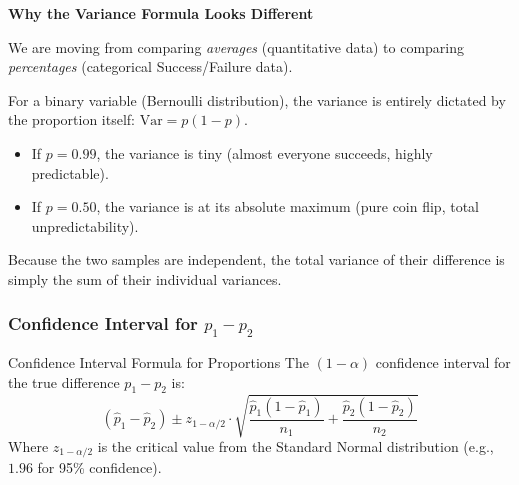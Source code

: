\vspace{0.2cm}
\begin{example}{\textbf{Why the Variance Formula Looks Different}}

We are moving from comparing \textit{averages} (quantitative data) to comparing \textit{percentages} (categorical Success/Failure data).

For a binary variable (Bernoulli distribution), the variance is entirely dictated by the proportion itself: $\text{Var} = p(1-p)$. 
\begin{itemize}
    \item If $p = 0.99$, the variance is tiny (almost everyone succeeds, highly predictable).
    \item If $p = 0.50$, the variance is at its absolute maximum (pure coin flip, total unpredictability).
\end{itemize}
Because the two samples are independent, the total variance of their difference is simply the sum of their individual variances.
\end{example}

\subsubsection{Confidence Interval for $p_1 - p_2$}

\begin{defbox}{Confidence Interval Formula for Proportions}
The $(1-\alpha)$ confidence interval for the true difference $p_1 - p_2$ is:
\begin{equation}
    (\hat{p}_{1}-\hat{p}_{2}) \pm z_{1-\alpha/2} \cdot \sqrt{\frac{\hat{p}_{1}(1-\hat{p}_{1})}{n_{1}}+\frac{\hat{p}_{2}(1-\hat{p}_{2})}{n_{2}}} 
\end{equation}
Where $z_{1-\alpha/2}$ is the critical value from the Standard Normal distribution (e.g., $1.96$ for 95\% confidence).
\end{defbox}

